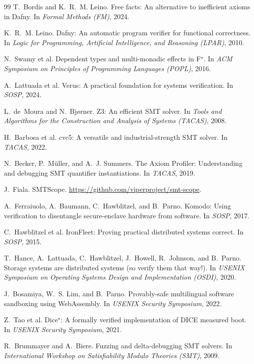 \documentclass[11pt]{article}
\begin{document}
\begin{thebibliography}{99}
 T.~Bordis and K.~R.~M. Leino. Free facts: An alternative to inefficient axioms in Dafny. In \emph{Formal Methods (FM)}, 2024.

 K.~R.~M. Leino. Dafny: An automatic program verifier for functional correctness. In \emph{Logic for Programming, Artificial Intelligence, and Reasoning (LPAR)}, 2010.

 N.~Swamy et al. Dependent types and multi-monadic effects in F$^\star$. In \emph{ACM Symposium on Principles of Programming Languages (POPL)}, 2016.

 A.~Lattuada et al. Verus: A practical foundation for systems verification. In \emph{SOSP}, 2024.

 L.~de~Moura and N.~Bj{\o}rner. Z3: An efficient SMT solver. In \emph{Tools and Algorithms for the Construction and Analysis of Systems (TACAS)}, 2008.

 H.~Barbosa et al. cvc5: A versatile and industrial-strength SMT solver. In \emph{TACAS}, 2022.

 N.~Becker, P.~M{\"u}ller, and A.~J. Summers. The Axiom Profiler: Understanding and debugging SMT quantifier instantiations. In \emph{TACAS}, 2019.

 J.~Fiala. SMTScope. \url{https://github.com/viperproject/smt-scope}.

 A.~Ferraiuolo, A.~Baumann, C.~Hawblitzel, and B.~Parno. Komodo: Using verification to disentangle secure-enclave hardware from software. In \emph{SOSP}, 2017.

 C.~Hawblitzel et al. IronFleet: Proving practical distributed systems correct. In \emph{SOSP}, 2015.

 T.~Hance, A.~Lattuada, C.~Hawblitzel, J.~Howell, R.~Johnson, and B.~Parno. Storage systems are distributed systems (so verify them that way!). In \emph{USENIX Symposium on Operating Systems Design and Implementation (OSDI)}, 2020.

 J.~Bosamiya, W.~S. Lim, and B.~Parno. Provably-safe multilingual software sandboxing using WebAssembly. In \emph{USENIX Security Symposium}, 2022.

 Z.~Tao et al. Dice$^\star$: A formally verified implementation of DICE measured boot. In \emph{USENIX Security Symposium}, 2021.

 R.~Brummayer and A.~Biere. Fuzzing and delta-debugging SMT solvers. In \emph{International Workshop on Satisfiability Modulo Theories (SMT)}, 2009.


\end{thebibliography}
\end{document}
